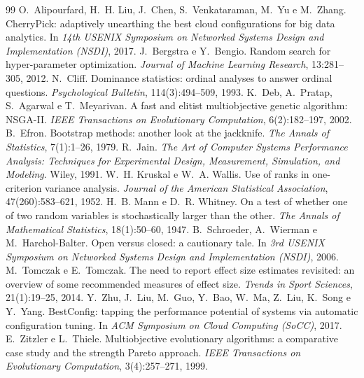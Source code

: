 \documentclass[11pt,a4paper]{article}
\begin{document}
\begin{thebibliography}{99}
 O.~Alipourfard, H.~H. Liu, J.~Chen, S.~Venkataraman, M.~Yu e M.~Zhang.
  CherryPick: adaptively unearthing the best cloud configurations for big data analytics.
  In \emph{14th USENIX Symposium on Networked Systems Design and Implementation (NSDI)}, 2017.
 J.~Bergstra e Y.~Bengio. Random search for hyper-parameter optimization.
  \emph{Journal of Machine Learning Research}, 13:281--305, 2012.
 N.~Cliff. Dominance statistics: ordinal analyses to answer ordinal questions.
  \emph{Psychological Bulletin}, 114(3):494--509, 1993.
 K.~Deb, A.~Pratap, S.~Agarwal e T.~Meyarivan. A fast and elitist multiobjective genetic algorithm: NSGA-II.
  \emph{IEEE Transactions on Evolutionary Computation}, 6(2):182--197, 2002.
 B.~Efron. Bootstrap methods: another look at the jackknife.
  \emph{The Annals of Statistics}, 7(1):1--26, 1979.
 R.~Jain. \emph{The Art of Computer Systems Performance Analysis: Techniques for Experimental Design,
  Measurement, Simulation, and Modeling}. Wiley, 1991.
 W.~H. Kruskal e W.~A. Wallis. Use of ranks in one-criterion variance analysis.
  \emph{Journal of the American Statistical Association}, 47(260):583--621, 1952.
 H.~B. Mann e D.~R. Whitney. On a test of whether one of two random variables is stochastically larger than the other.
  \emph{The Annals of Mathematical Statistics}, 18(1):50--60, 1947.
 B.~Schroeder, A.~Wierman e M.~Harchol-Balter. Open versus closed: a cautionary tale.
  In \emph{3rd USENIX Symposium on Networked Systems Design and Implementation (NSDI)}, 2006.
 M.~Tomczak e E.~Tomczak. The need to report effect size estimates revisited: an overview of some
  recommended measures of effect size. \emph{Trends in Sport Sciences}, 21(1):19--25, 2014.
 Y.~Zhu, J.~Liu, M.~Guo, Y.~Bao, W.~Ma, Z.~Liu, K.~Song e Y.~Yang.
  BestConfig: tapping the performance potential of systems via automatic configuration tuning.
  In \emph{ACM Symposium on Cloud Computing (SoCC)}, 2017.
 E.~Zitzler e L.~Thiele. Multiobjective evolutionary algorithms: a comparative case study and the
  strength Pareto approach. \emph{IEEE Transactions on Evolutionary Computation}, 3(4):257--271, 1999.
\end{thebibliography}
\end{document}
